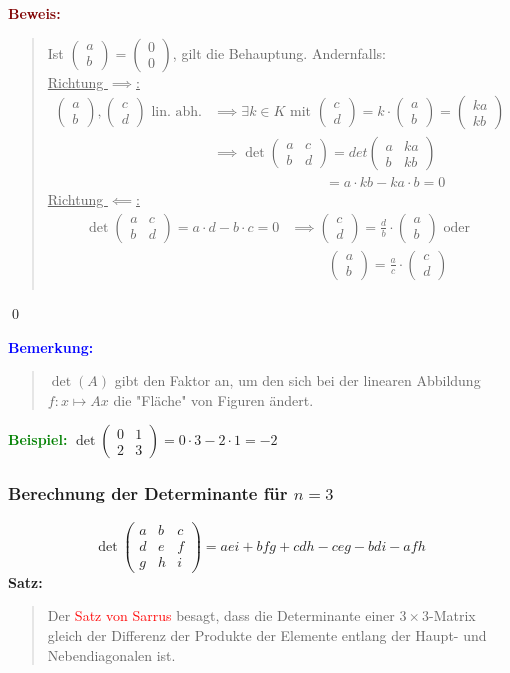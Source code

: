 \documentclass{article}
\newcommand{\red}[1]{\textcolor{red}{#1}}
\newcommand{\blue}[1]{\textcolor{blue}{#1}}
\newcommand{\green}[1]{\textcolor{green}{#1}}
\newcommand{\dgr}[1]{\textcolor{dgr}{#1}}
\newcommand{\maroon}[1]{\textcolor{maroon}{#1}}
\newcommand{\ex}{\green{\textbf{Beispiel: }}}
\newcommand{\an}[1]{\blue{\textbf{Bemerkung: }}\begin{quote}#1\end{quote}}
\newcommand{\se}[1]{\dgr{\textbf{Satz: }}\begin{quote}#1\end{quote}}
\newcommand{\pr}[1]{\maroon{\textbf{Beweis: }}\begin{quote}#1\end{quote}\qed}
\newcommand{\vvec}[2]{\begin{pmatrix}#1\\#2\end{pmatrix}}
\begin{document}
\pr{
    Ist $\vvec{a}{b} = \vvec{0}{0}$, gilt die Behauptung. Andernfalls:\\
    \underline{Richtung $\implies$:} \begin{align*}
        \vvec{a}{b}, \vvec{c}{d} \text{ lin. abh.} &\implies \exists k \in K \text{ mit } \vvec{c}{d} = k \cdot \vvec{a}{b} = \vvec{ka}{kb}\\
        &\implies \det \begin{pmatrix}
            a & c\\
            b & d
        \end{pmatrix} = det \begin{pmatrix}
            a & ka\\
            b & kb
        \end{pmatrix}\\
        & \hspace{8em} = a \cdot kb - ka \cdot b = 0
    \end{align*}
    \underline{Richtung $\impliedby$:} \begin{align*}
        \det \begin{pmatrix}
            a & c\\
            b & d
        \end{pmatrix} = a \cdot d - b \cdot c = 0 &\implies \vvec{c}{d} = \frac{d}{b} \cdot \vvec{a}{b} \text{ oder }\\
        &\phantom{\implies \text{ }} \vvec{a}{b} = \frac{a}{c} \cdot \vvec{c}{d}\\
    \end{align*}
}

\an{
    $\det(A)$ gibt den Faktor an, um den sich bei der linearen Abbildung $f: x \mapsto Ax$ die "Fläche" von Figuren ändert.
}

\ex $\det \begin{pmatrix}
    0 & 1\\
    2 & 3
\end{pmatrix} = 0 \cdot 3 - 2 \cdot 1 = -2$

\subsubsection{\texorpdfstring{Berechnung der Determinante für $n = 3$}{Berechnung der Determinante für n = 3}}

\[
\det \begin{pmatrix}
    a & b & c\\
    d & e & f\\
    g & h & i
\end{pmatrix} = aei + bfg + cdh - ceg - bdi - afh
\]
\se{
    Der \red{Satz von Sarrus} besagt, dass die Determinante einer $3 \times 3$-Matrix gleich der Differenz der Produkte der Elemente entlang der Haupt- und Nebendiagonalen ist.
}
\end{document}
